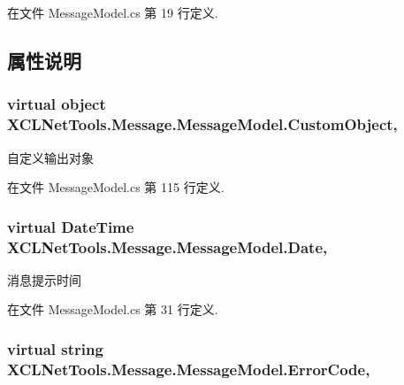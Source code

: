 在文件 Message\-Model.\-cs 第 19 行定义.



\subsection{属性说明}
\hypertarget{class_x_c_l_net_tools_1_1_message_1_1_message_model_a8065226d89965a09b9ff8e69ba9974ca}{
\subsubsection[{Custom\-Object}]{\setlength{\rightskip}{0pt plus 5cm}virtual object X\-C\-L\-Net\-Tools.\-Message.\-Message\-Model.\-Custom\-Object\hspace{0.3cm}{\ttfamily [get]}, {\ttfamily [set]}}}\label{class_x_c_l_net_tools_1_1_message_1_1_message_model_a8065226d89965a09b9ff8e69ba9974ca}


自定义输出对象 



在文件 Message\-Model.\-cs 第 115 行定义.

\hypertarget{class_x_c_l_net_tools_1_1_message_1_1_message_model_a04ede00490c3dbabea1fc01e6150715a}{
\subsubsection[{Date}]{\setlength{\rightskip}{0pt plus 5cm}virtual Date\-Time X\-C\-L\-Net\-Tools.\-Message.\-Message\-Model.\-Date\hspace{0.3cm}{\ttfamily [get]}, {\ttfamily [set]}}}\label{class_x_c_l_net_tools_1_1_message_1_1_message_model_a04ede00490c3dbabea1fc01e6150715a}


消息提示时间 



在文件 Message\-Model.\-cs 第 31 行定义.

\hypertarget{class_x_c_l_net_tools_1_1_message_1_1_message_model_ab169d7bab20868e935d775459b72e625}{
\subsubsection[{Error\-Code}]{\setlength{\rightskip}{0pt plus 5cm}virtual string X\-C\-L\-Net\-Tools.\-Message.\-Message\-Model.\-Error\-Code\hspace{0.3cm}{\ttfamily [get]}, {\ttfamily [set]}}}\label{class_x_c_l_net_tools_1_1_message_1_1_message_model_ab169d7bab20868e935d775459b72e625}


